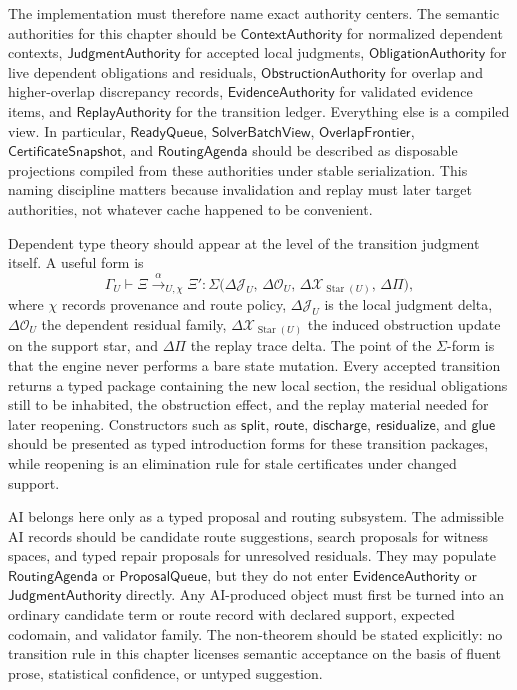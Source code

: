 \documentclass[11pt]{report}
\begin{document}
The implementation must therefore name exact authority centers. The semantic authorities for this chapter should be $\mathsf{ContextAuthority}$ for normalized dependent contexts, $\mathsf{JudgmentAuthority}$ for accepted local judgments, $\mathsf{ObligationAuthority}$ for live dependent obligations and residuals, $\mathsf{ObstructionAuthority}$ for overlap and higher-overlap discrepancy records, $\mathsf{EvidenceAuthority}$ for validated evidence items, and $\mathsf{ReplayAuthority}$ for the transition ledger. Everything else is a compiled view. In particular, $\mathsf{ReadyQueue}$, $\mathsf{SolverBatchView}$, $\mathsf{OverlapFrontier}$, $\mathsf{CertificateSnapshot}$, and $\mathsf{RoutingAgenda}$ should be described as disposable projections compiled from these authorities under stable serialization. This naming discipline matters because invalidation and replay must later target authorities, not whatever cache happened to be convenient.

Dependent type theory should appear at the level of the transition judgment itself. A useful form is
\[
\Gamma_U \vdash
\Xi \xrightarrow{\alpha}_{U,\chi}
\Xi'
:
\Sigma\bigl(
\Delta \mathcal{J}_U,\,
\Delta \mathcal{O}_U,\,
\Delta \mathcal{X}_{\operatorname{Star}(U)},\,
\Delta \Pi
\bigr),
\]
where $\chi$ records provenance and route policy, $\Delta \mathcal{J}_U$ is the local judgment delta, $\Delta \mathcal{O}_U$ the dependent residual family, $\Delta \mathcal{X}_{\operatorname{Star}(U)}$ the induced obstruction update on the support star, and $\Delta \Pi$ the replay trace delta. The point of the $\Sigma$-form is that the engine never performs a bare state mutation. Every accepted transition returns a typed package containing the new local section, the residual obligations still to be inhabited, the obstruction effect, and the replay material needed for later reopening. Constructors such as $\mathsf{split}$, $\mathsf{route}$, $\mathsf{discharge}$, $\mathsf{residualize}$, and $\mathsf{glue}$ should be presented as typed introduction forms for these transition packages, while reopening is an elimination rule for stale certificates under changed support.

AI belongs here only as a typed proposal and routing subsystem. The admissible AI records should be candidate route suggestions, search proposals for witness spaces, and typed repair proposals for unresolved residuals. They may populate $\mathsf{RoutingAgenda}$ or $\mathsf{ProposalQueue}$, but they do not enter $\mathsf{EvidenceAuthority}$ or $\mathsf{JudgmentAuthority}$ directly. Any AI-produced object must first be turned into an ordinary candidate term or route record with declared support, expected codomain, and validator family. The non-theorem should be stated explicitly: no transition rule in this chapter licenses semantic acceptance on the basis of fluent prose, statistical confidence, or untyped suggestion.
\end{document}
